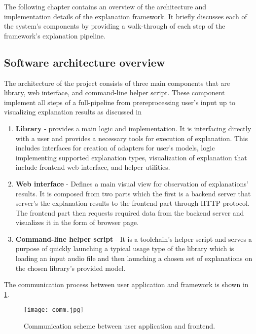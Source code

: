 \documentclass[
    bindingoffset=5mm,  %
    footnoteindent=3mm, %
    hyphenation=true    %
]{src/wut-thesis}
\begin{document}
    The following chapter contains an overview of the architecture and implementation details of the explanation framework. It briefly discusses each of the system's components by providing
    a walk-through of each step of the framework's explanation pipeline.

\subsection{Software architecture overview}

    The architecture of the project consists of three main components that are library, web interface, and command-line helper script.
    These component implement all steps of a full-pipeline from prereprocessing
    user's input up to visualizing explanation results as discussed in

\begin{enumerate}
    \item \textbf{Library} - provides a main logic and implementation. It is interfacing directly
        with a user and provides a necessary tools for execution of explanation. This includes   interfaces for creation of adapters for user's models, logic implementing supported explanation types, visualization of explanation that include frontend web interface, and helper utilities.

    \item \textbf{Web interface} - Defines a main visual view for observation of explanations' results. It is composed from two parts which the first is a backend server that server's the explanation results to the frontend part through HTTP protocol. The frontend part then requests required data from the backend server and visualizes it in the form of browser page.

    \item \textbf{Command-line helper script} - It is a toolchain's helper script and serves a purpose of quickly launching a typical usage type of the library which is loading an input audio file and then launching a chosen set of explanations on the chosen library's provided model.
\end{enumerate}

The communication process between user application and framework is shown in \ref{fig:CommunicationArchitecture}.

\begin{figure}[h!] %
    \centering
    \texttt{[image: comm.jpg]}
    \caption{Communication scheme between user application and frontend.}
    \label{fig:CommunicationArchitecture}
\end{figure}
\end{document}
